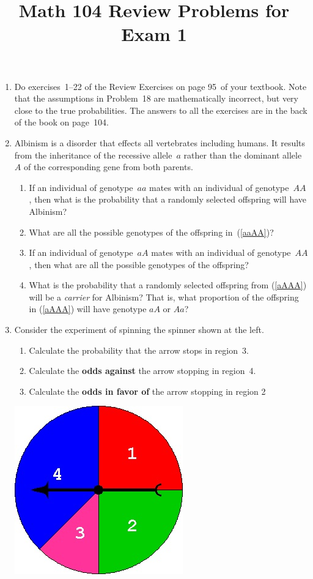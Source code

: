 \documentclass[12pt]{article}
\author{}\date{}
\title{Math 104 Review Problems for Exam 1}\author{}
\begin{document}
\maketitle
\pagestyle{empty}
\begin{enumerate}
\item Do exercises~1--22 of the Review Exercises
on page 95~of your textbook. Note that the assumptions
in Problem~18 are mathematically incorrect,
but very close to the true probabilities.
The answers to all the exercises are in the
back of the book on page~104.
\item Albinism is a disorder that effects all vertebrates
including humans. It results from the inheritance
of the recessive allele~$a$ rather than the dominant
allele~$A$ of the corresponding gene from both parents.
\begin{enumerate}
\item\label{aaAA} If an individual of genotype~$aa$ mates with
an individual of genotype~$AA$, then what is the probability
that a randomly selected offspring will have Albinism?
\item What are all the possible genotypes of the offspring
in~(\ref{aaAA})?
\item\label{aAAA} If an individual of genotype~$aA$ mates with
an individual of genotype~$AA$, then
what are all the possible genotypes of the offspring?
\item What is the probability that a randomly selected
offspring from (\ref{aAAA})
will be a {\em carrier} for Albinism? That is,
what proportion of the offspring in  (\ref{aAAA})
will have genotype $aA$ or $Aa$?
\end{enumerate}

\item\label{Spinner}\begin{multicols}{2}
Consider the experiment of spinning the spinner
shown at the left.
\begin{enumerate}
\item Calculate the probability that the arrow stops
in region~3.
\item Calculate the {\bf odds against} the arrow stopping
in region~4.
\item Calculate the {\bf odds in favor of} the arrow
stopping in region 2
\end{enumerate}
\includegraphics[scale=.5]{R1Spinner}
\end{multicols}


\end{enumerate}
\end{document}
